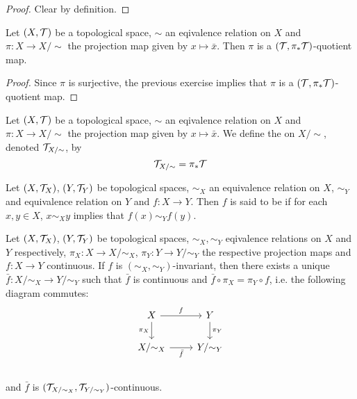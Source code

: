 \documentclass{book}
\begin{document}
	\begin{proof}
	Clear by definition.
	\end{proof}
	
	
	\begin{ex} 
	Let $(X, \mathcal{T})$ be a topological space, $\sim$ an eqivalence relation on $X$ and $\pi:X \rightarrow X/\sim$ the projection map given by $x \mapsto \bar{x}$. Then $\pi$ is a $(\mathcal{T}, \pi_*\mathcal{T})$-quotient map. 
	\end{ex}
	
	\begin{proof}
	Since $\pi$ is surjective, the previous exercise implies that $\pi$ is a $(\mathcal{T}, \pi_*\mathcal{T})$-quotient map. 
	\end{proof}

	\begin{defn} 
		Let $(X, \mathcal{T})$ be a topological space, $\sim$ an eqivalence relation on $X$ and $\pi:X \rightarrow X/\sim$ the projection map given by $x \mapsto \bar{x}$. We define the  on $X/ \sim$, denoted $\mathcal{T}_{X/ \sim}$, by $$\mathcal{T}_{X/ \sim} = \pi_{*}\mathcal{T}$$
	\end{defn}
	
	\begin{defn} 
		Let $(X, \mathcal{T}_X)$, $(Y, \mathcal{T}_Y)$ be topological spaces, $\sim_X$ an equivalence relation on $X$, $\sim_Y$ and equivalence relation on $Y$ and $f : X \rightarrow Y $. Then $f$ is said to be  if for each $x, y \in X$, $x \sim_X y$ implies that $f(x) \sim_Y f(y)$.
	\end{defn}
	
	\begin{ex} 
	Let $(X, \mathcal{T}_X)$, $(Y, \mathcal{T}_Y)$ be topological spaces, $\sim_X, \sim_Y$ eqivalence relations on $X$ and $Y$ respectively, $\pi_X:X \rightarrow X/\sim_X$, $\pi_Y:Y \rightarrow Y/\sim_Y$ the respective projection maps and $f:X \rightarrow Y$ continuous. If $f$ is $(\sim_X, \sim_Y)$-invariant, then there exists a unique $\bar{f}:X / {\sim}_X \rightarrow Y/ {\sim_Y}$ such that $\bar{f}$ is continuous and $\bar{f} \circ \pi_X = \pi_Y \circ f$, i.e. the following diagram commutes:
	\[ 
	\begin{tikzcd}
		X  \arrow[r, "f"]  \arrow[d, "\pi_X"']  & Y   \arrow[d, "\pi_Y"]\\
		X/ {\sim_X} \arrow[r, "\bar{f}"'] &  Y / {\sim_Y} \\
	\end{tikzcd}
	\]
	and $\bar{f}$ is $(\mathcal{T}_{X/ \sim_X}, \mathcal{T}_{Y/ \sim_Y})$-continuous.
	\end{ex}
	
\end{document}
